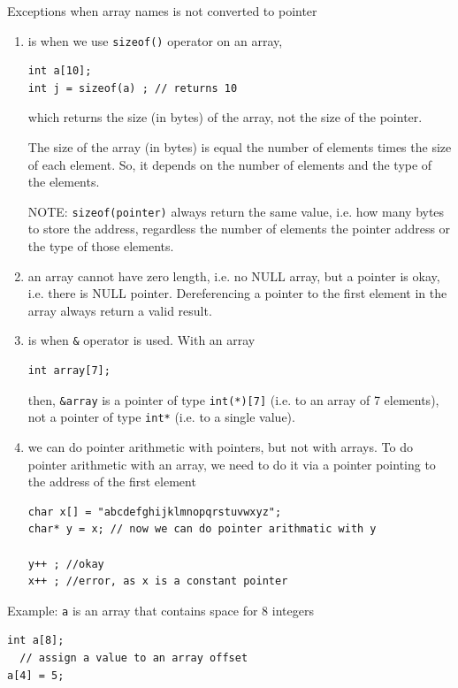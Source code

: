 Exceptions when array names is not converted to pointer
\begin{enumerate}
  \item  is when we use \verb!sizeof()! operator on an array, \label{sec:sizeof} 
  
\begin{verbatim}
int a[10];
int j = sizeof(a) ; // returns 10
\end{verbatim}
  which returns the  size (in bytes) of the array, not the size of the pointer. 
  
  The size of the array (in bytes) is equal the number of elements times the size of each
  element. So, it depends on the number of elements and the type of the
  elements.

NOTE: \verb!sizeof(pointer)! always return the same value, i.e. how many
bytes to store the address, regardless the number of elements the pointer
address or the type of those elements.

  \item an array cannot have zero length, i.e. no NULL array, but a pointer is
  okay, i.e. there is NULL pointer. Dereferencing a pointer to the first element
  in the array always return a valid result.
  
   
  \item is when \verb!&! operator is used. With an array
  
\begin{verbatim}
int array[7];
\end{verbatim}  
then, \verb!&array! is a pointer of type \verb!int(*)[7]! (i.e. to an array of 7
elements), not a pointer of type \verb!int*! (i.e. to a single value).
  
  \item we can do pointer arithmetic with pointers, but not with arrays. To do
  pointer arithmetic with an array, we need to do it via a pointer pointing to
  the address of the first element
\begin{verbatim}
char x[] = "abcdefghijklmnopqrstuvwxyz";
char* y = x; // now we can do pointer arithmatic with y

y++ ; //okay
x++ ; //error, as x is a constant pointer 
\end{verbatim} 
\end{enumerate}


Example: \verb!a! is an array that contains space for 8
integers
\begin{verbatim}
int a[8];
  // assign a value to an array offset
a[4] = 5;
\end{verbatim}

